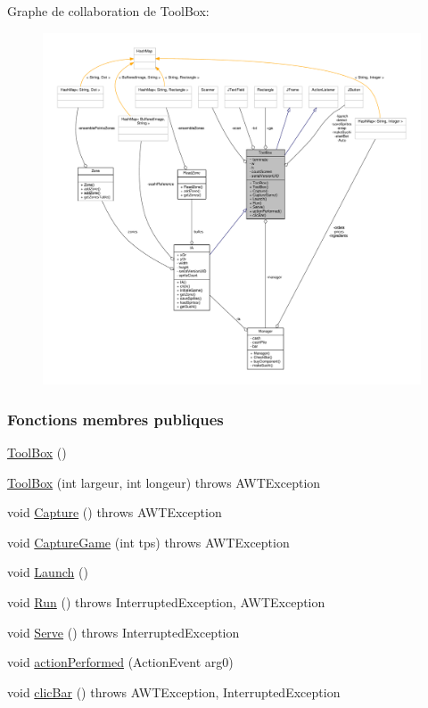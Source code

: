 Graphe de collaboration de Tool\+Box\+:\nopagebreak
\begin{figure}[H]
\begin{center}
\leavevmode
\includegraphics[width=350pt]{classToolBox__coll__graph}
\end{center}
\end{figure}
\subsubsection*{Fonctions membres publiques}
\begin{DoxyCompactItemize}
\item 
\hyperlink{classToolBox_af5af1824e66f1864834b2e7f4460572f}{Tool\+Box} ()
\item 
\hyperlink{classToolBox_a15b310eada2bb4adcc73a641a67b8d49}{Tool\+Box} (int largeur, int longeur)  throws A\+W\+T\+Exception 
\item 
void \hyperlink{classToolBox_a6e2363d41efa87ec225910f1665f04c9}{Capture} ()  throws A\+W\+T\+Exception 
\item 
void \hyperlink{classToolBox_a059e1404af5bcc5fbb1bb9dedfc20d66}{Capture\+Game} (int tps)  throws A\+W\+T\+Exception 
\item 
void \hyperlink{classToolBox_a84973bc465d7edad32f758829595c1da}{Launch} ()
\item 
void \hyperlink{classToolBox_aa0f5a8cb133c58a8d3ce98bc3e98d8ed}{Run} ()  throws Interrupted\+Exception, A\+W\+T\+Exception 
\item 
void \hyperlink{classToolBox_ad1cd486e0e4b502e023e0835638a9e0f}{Serve} ()  throws Interrupted\+Exception 
\item 
void \hyperlink{classToolBox_aa2c48c9b70735e54ed4123834ef9e5cf}{action\+Performed} (Action\+Event arg0)
\item 
void \hyperlink{classToolBox_ae3baa18f028039800f8c9fc07abf0931}{clic\+Bar} ()  throws A\+W\+T\+Exception, Interrupted\+Exception
\end{DoxyCompactItemize}
